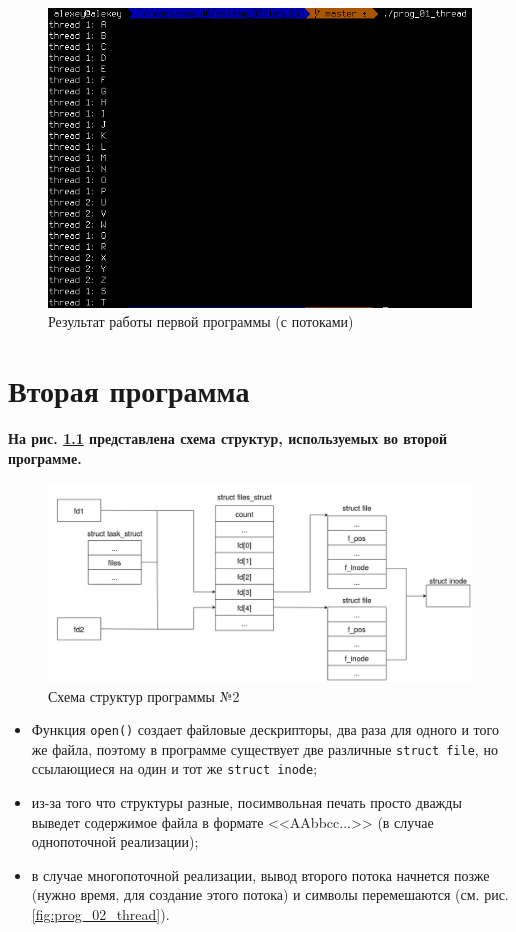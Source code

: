 \documentclass[12pt]{report}
\begin{document}
\begin{figure}[H]
	\centering
	\includegraphics[scale=0.6]{img/prog_01_thread.png}
	\caption{Результат работы первой программы (с потоками)}
	\label{fig:prog_01_thread}
\end{figure}

\chapter{Вторая программа}

\textbf{На рис. \ref{fig:prog_02_schema} представлена схема структур, используемых во второй программе.}

\begin{figure}[H]
	\centering
	\includegraphics[scale=0.4]{img/prog_02_schema.jpg}
	\caption{Схема структур программы №2}
	\label{fig:prog_02_schema}
\end{figure}

\begin{itemize}
	\item Функция \texttt{open()} создает файловые дескрипторы, два раза для одного и того же файла, поэтому в программе существует две различные \texttt{struct file}, но ссылающиеся на один и тот же \texttt{struct inode};
	\item из-за того что структуры разные, посимвольная печать просто дважды выведет содержимое файла в формате <<AAbbcc...>> (в случае однопоточной реализации); 
	\item в случае многопоточной реализации, вывод второго потока начнется позже (нужно время, для создание этого потока) и символы перемешаются (см. рис. \ref{fig:prog_02_thread}).
\end{itemize}
\end{document}
